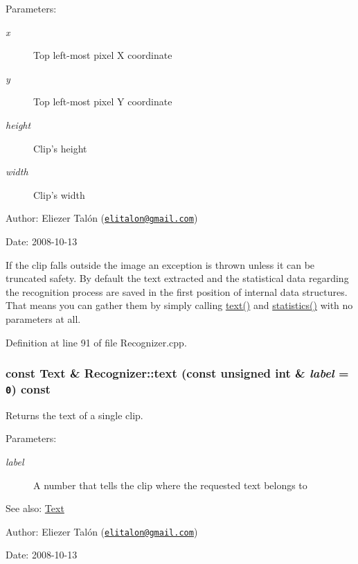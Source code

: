 \begin{Desc}
\item[Parameters:]
\begin{description}
\item[{\em x}]Top left-most pixel X coordinate \item[{\em y}]Top left-most pixel Y coordinate \item[{\em height}]Clip's height \item[{\em width}]Clip's width\end{description}
\end{Desc}
\begin{Desc}
\item[Author:]Eliezer Talón (\href{mailto:elitalon@gmail.com}{\tt elitalon@gmail.com}) \end{Desc}
\begin{Desc}
\item[Date:]2008-10-13\end{Desc}
If the clip falls outside the image an exception is thrown unless it can be truncated safety. By default the text extracted and the statistical data regarding the recognition process are saved in the first position of internal data structures. That means you can gather them by simply calling \hyperlink{class_recognizer_c5d20b511888a60a6c1a81c0a4206ec2}{text()} and \hyperlink{class_recognizer_8b38356d2741969e67cd6b4f507897ba}{statistics()} with no parameters at all. 

Definition at line 91 of file Recognizer.cpp.\hypertarget{class_recognizer_c5d20b511888a60a6c1a81c0a4206ec2}{
\subsubsection[text]{\setlength{\rightskip}{0pt plus 5cm}const {\bf Text} \& Recognizer::text (const unsigned int \& {\em label} = {\tt 0}) const}}
\label{class_recognizer_c5d20b511888a60a6c1a81c0a4206ec2}


Returns the text of a single clip. 

\begin{Desc}
\item[Parameters:]
\begin{description}
\item[{\em label}]A number that tells the clip where the requested text belongs to\end{description}
\end{Desc}
\begin{Desc}
\item[See also:]\hyperlink{class_text}{Text}\end{Desc}
\begin{Desc}
\item[Author:]Eliezer Talón (\href{mailto:elitalon@gmail.com}{\tt elitalon@gmail.com}) \end{Desc}
\begin{Desc}
\item[Date:]2008-10-13 \end{Desc}


